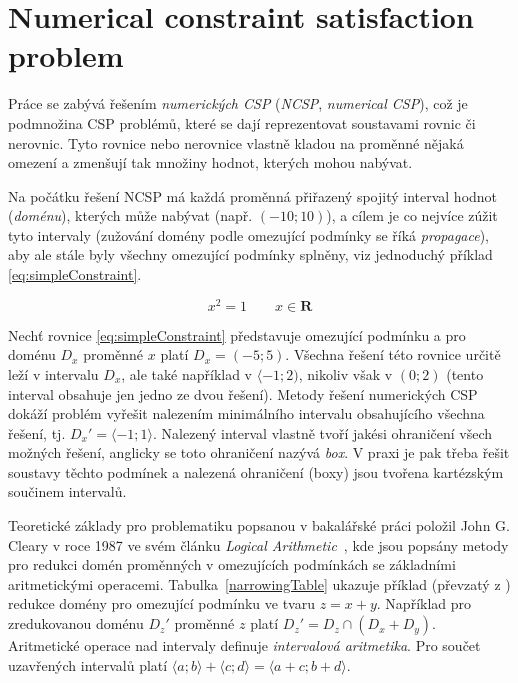 \documentclass[thesis=B,czech]{FITthesis}[2012/06/26]
\theoremstyle{definition}
\begin{document}
\subsection{}

\section{Numerical constraint satisfaction problem}



Práce se zabývá řešením \emph{numerických CSP} (\emph{NCSP}, \emph{numerical CSP}), což je podmnožina CSP problémů, které se dají reprezentovat soustavami rovnic či nerovnic. Tyto rovnice nebo nerovnice vlastně kladou na proměnné nějaká omezení a zmenšují tak množiny hodnot, kterých mohou nabývat.

Na počátku řešení NCSP má každá proměnná přiřazený spojitý interval hodnot (\emph{doménu}), kterých může nabývat (např. $(-10;10)$), a cílem je co nejvíce zúžit tyto intervaly (zužování domény podle omezující podmínky se říká \emph{propagace}), aby ale stále byly všechny omezující podmínky splněny, viz jednoduchý příklad \ref{eq:simpleConstraint}.

\begin{equation} \label{eq:simpleConstraint}
x^2 = 1\qquad x \in \boldsymbol{R}
\end{equation}

Nechť rovnice \ref{eq:simpleConstraint} představuje omezující podmínku a pro doménu $D_x$ proměnné $x$ platí $D_x = (-5;5)$. Všechna řešení této rovnice určitě leží v intervalu $D_x$, ale také například v $\langle -1;2)$, nikoliv však v $(0;2)$ (tento interval obsahuje jen jedno ze dvou řešení). Metody řešení numerických CSP dokáží problém vyřešit nalezením minimálního intervalu obsahujícího všechna řešení, tj. $D_x' = \langle -1;1\rangle$. Nalezený interval vlastně tvoří jakési ohraničení všech možných řešení, anglicky se toto ohraničení nazývá \emph{box}. V praxi je pak třeba řešit soustavy těchto podmínek a nalezená ohraničení (boxy) jsou tvořena kartézským součinem intervalů.

Teoretické základy pro problematiku popsanou v bakalářské práci položil John G. Cleary v roce 1987 ve svém článku \emph{Logical Arithmetic}~\cite{cleary87}, kde jsou popsány metody pro redukci domén proměnných v omezujících podmínkách se základními aritmetickými operacemi. Tabulka~\ref{narrowingTable} ukazuje příklad (převzatý z \cite{cleary87}) redukce domény pro omezující podmínku ve tvaru $z = x + y$. Například pro zredukovanou doménu $D_z'$ proměnné $z$ platí $D_z' = D_z \cap (D_x + D_y)$. Aritmetické operace nad intervaly definuje \emph{intervalová aritmetika}. Pro součet uzavřených intervalů platí $\langle a;b \rangle + \langle c;d \rangle = \langle a + c ; b + d \rangle$.
\end{document}
